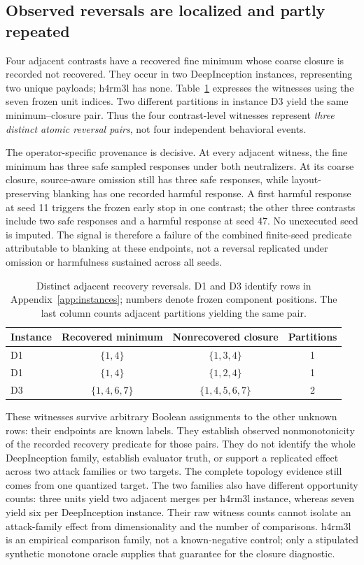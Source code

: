 \documentclass{article}
\begin{document}
\subsection{Observed reversals are localized and partly repeated}

Four adjacent contrasts have a recovered fine minimum whose coarse closure
is recorded not recovered. They occur in two DeepInception instances,
representing two unique payloads; h4rm3l has none. Table~\ref{tab:witnesses}
expresses the witnesses using the seven frozen unit indices. Two different
partitions in instance D3 yield the same minimum--closure pair. Thus the
four contrast-level witnesses represent \emph{three distinct atomic
reversal pairs}, not four independent behavioral events.

The operator-specific provenance is decisive. At every adjacent witness,
the fine minimum has three safe sampled responses under both neutralizers.
At its coarse closure, source-aware omission still has three safe responses,
while layout-preserving blanking has one recorded harmful response. A first
harmful response at seed 11 triggers the frozen early stop in one contrast;
the other three contrasts include two safe responses and a harmful response
at seed 47. No unexecuted seed is imputed. The signal is therefore a failure
of the combined finite-seed predicate attributable to blanking at these
endpoints, not a reversal replicated under omission or harmfulness sustained
across all seeds.

\begin{table}[t]
\caption{Distinct adjacent recovery reversals. D1 and D3 identify rows in
Appendix~\ref{app:instances}; numbers denote frozen component positions.
The last column counts adjacent partitions yielding the same pair.}
\label{tab:witnesses}
\centering
\begin{tabular}{lccc}
\toprule
Instance & Recovered minimum & Nonrecovered closure & Partitions \\
\midrule
D1 & $\{1,4\}$ & $\{1,3,4\}$ & 1 \\
D1 & $\{1,4\}$ & $\{1,2,4\}$ & 1 \\
D3 & $\{1,4,6,7\}$ & $\{1,4,5,6,7\}$ & 2 \\
\bottomrule
\end{tabular}
\end{table}

These witnesses survive arbitrary Boolean assignments to the other unknown
rows: their endpoints are known labels. They establish observed
nonmonotonicity of the recorded recovery predicate for those pairs. They do
not identify the whole DeepInception family, establish evaluator truth, or
support a replicated effect across two attack families or two targets.
The complete topology evidence still comes from one quantized target.
The two families also have different opportunity counts: three units yield
two adjacent merges per h4rm3l instance, whereas seven yield six per
DeepInception instance. Their raw witness counts cannot isolate an attack-family
effect from dimensionality and the number of comparisons. h4rm3l is an
empirical comparison family, not a known-negative control; only a stipulated
synthetic monotone oracle supplies that guarantee for the closure diagnostic.
\end{document}
